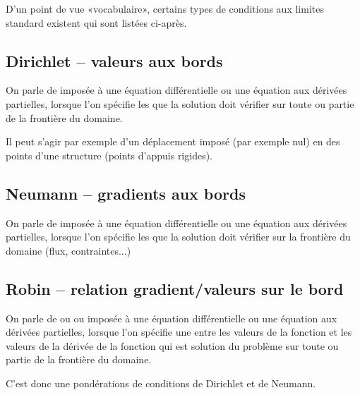 D'un point de vue «vocabulaire», certains types de conditions aux limites standard
existent qui sont listées ci-après.

\medskip
\subsection{Dirichlet -- valeurs aux bords}

On parle de  imposée à une équation différentielle ou une équation aux dérivées partielles,
lorsque l'on spécifie les  que la solution doit vérifier sur toute ou partie de
la frontière du domaine.

\medskip
Il peut s'agir par exemple d'un déplacement imposé (par exemple nul) en des points
d'une structure (points d'appuis rigides).

\medskip
\subsection{Neumann -- gradients aux bords}

On parle de  imposée à une équation différentielle ou une équation aux dérivées partielles,
lorsque l'on spécifie les  que la solution doit vérifier sur la frontière du 
domaine (flux, contraintes...)

\medskip
\subsection{Robin -- relation gradient/valeurs sur le bord}

On parle de  ou  
ou  imposée à une équation différentielle ou une équation aux dérivées partielles,
lorsque l'on spécifie une  entre les valeurs de la fonction et les
valeurs de la dérivée de la fonction qui est solution du problème sur toute ou partie de
la frontière du domaine.

C'est donc une pondérations de conditions de Dirichlet et de Neumann.

